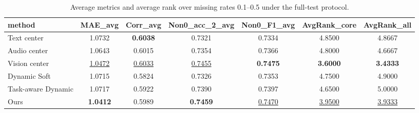 \begin{table}[t]
\centering
\small
\begin{tabular}{l c c c c c c}
\toprule
method & MAE_avg & Corr_avg & Non0_acc_2_avg & Non0_F1_avg & AvgRank_core & AvgRank_all \\ 
\midrule
Text center & 1.0732 & \textbf{0.6038} & 0.7321 & 0.7334 & 4.8500 & 4.8667 \\ 
Audio center & 1.0643 & 0.6015 & 0.7354 & 0.7366 & 4.8000 & 4.6667 \\ 
Vision center & \underline{1.0472} & \underline{0.6033} & \underline{0.7455} & \textbf{0.7475} & \textbf{3.6000} & \textbf{3.4333} \\ 
Dynamic Soft & 1.0715 & 0.5824 & 0.7326 & 0.7353 & 4.7500 & 4.9000 \\ 
Task-aware Dynamic & 1.0717 & 0.5922 & 0.7390 & 0.7397 & 4.6500 & 5.0000 \\ 
Ours & \textbf{1.0412} & 0.5989 & \textbf{0.7459} & \underline{0.7470} & \underline{3.9500} & \underline{3.9333} \\ 
\bottomrule
\end{tabular}
\caption{Average metrics and average rank over missing rates 0.1--0.5 under the full-test protocol.}
\label{tab:residual_avg_summary}
\end{table}
